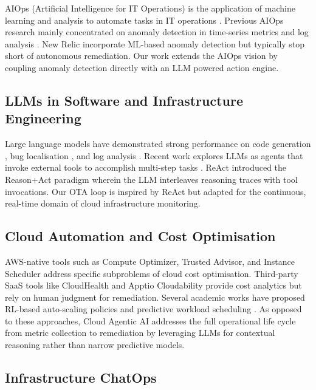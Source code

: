 \documentclass{ieeeaccess}
\begin{document}
AIOps (Artificial Intelligence for IT Operations) is the application of machine learning and analysis to automate tasks in IT operations \cite{dang2019aiops}. Previous AIOps research mainly concentrated on anomaly detection in time-series metrics \cite{chen2020aiops} and log analysis \cite{du2017deeplog}.
New Relic incorporate ML-based anomaly detection but typically stop short of autonomous remediation. Our work extends the AIOps vision by coupling anomaly detection directly with an LLM powered action engine.



\subsection{LLMs in Software and Infrastructure Engineering}

Large language models have demonstrated strong performance on code
generation \cite{chen2021codex}, bug localisation \cite{xia2023automated},
and log analysis \cite{jiang2023llmparser}. Recent work explores LLMs as
agents that invoke external tools to accomplish multi-step tasks
\cite{yao2023react, schick2023toolformer}. ReAct \cite{yao2023react}
introduced the Reason+Act paradigm wherein the LLM interleaves reasoning
traces with tool invocations. Our OTA loop is inspired by ReAct but adapted
for the continuous, real-time domain of cloud infrastructure monitoring.

\subsection{Cloud Automation and Cost Optimisation}

AWS-native tools such as Compute Optimizer, Trusted Advisor, and Instance
Scheduler address specific subproblems of cloud cost optimisation.
Third-party SaaS tools like CloudHealth and Apptio Cloudability provide cost
analytics but rely on human judgment for remediation.
Several academic works have proposed RL-based auto-scaling policies \cite{chen2018rl} and predictive workload scheduling \cite{arabnejad2017predictive}. As opposed to these approaches, Cloud Agentic AI addresses the full operational life cycle from metric collection to remediation by leveraging LLMs for contextual reasoning rather than narrow predictive models.

\subsection{Infrastructure ChatOps}
\end{document}
